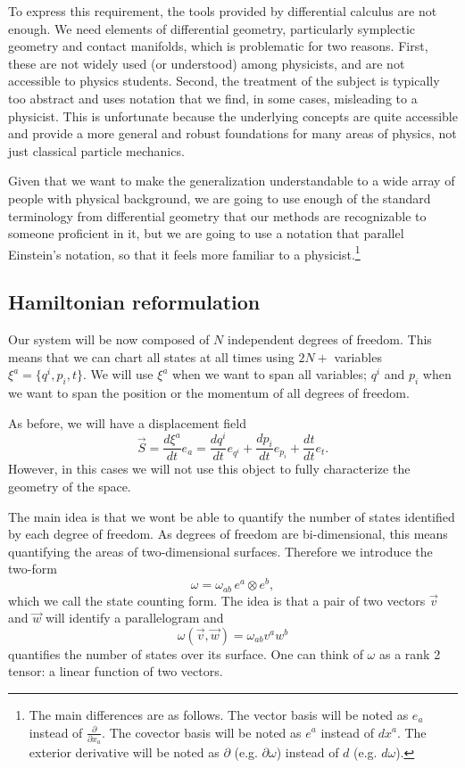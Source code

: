 \documentclass[10pt,twocolumn, nofootinbib]{revtex4-2}
\begin{document}
To express this requirement, the tools provided by differential calculus are not enough. We need elements of differential geometry, particularly symplectic geometry and contact manifolds, which is problematic for two reasons. First, these are not widely used (or understood) among physicists, and are not accessible to physics students. Second, the treatment of the subject is typically too abstract and uses notation that we find, in some cases, misleading to a physicist. This is unfortunate because the underlying concepts are quite accessible and provide a more general and robust foundations for many areas of physics, not just classical particle mechanics.

Given that we want to make the generalization understandable to a wide array of people with physical background, we are going to use enough of the standard terminology from differential geometry that our methods are recognizable to someone proficient in it, but we are going to use a notation that parallel Einstein's notation, so that it feels more familiar to a physicist.\footnote{The main differences are as follows. The vector basis will be noted as $e_a$ instead of $\frac{\partial}{\partial x_a}$. The covector basis will be noted as $e^a$ instead of $dx^a$. The exterior derivative will be noted as $\partial$ (e.g. $\partial \omega$) instead of $d$ (e.g. $d \omega$).}

\subsection{Hamiltonian reformulation}

Our system will be now composed of $N$ independent degrees of freedom. This means that we can chart all states at all times using $2N + $ variables $\xi^a = \{ q^i, p_i, t\}$. We will use $\xi^a$ when we want to span all variables; $q^i$ and $p_i$ when we want to span the position or the momentum of all degrees of freedom.

As before, we will have a displacement field
\begin{equation}
	\vec{S} = \frac{d\xi^a}{dt} e_{a} = \frac{dq^i}{dt} e_{q^i} + \frac{dp_i}{dt} e_{p_i} + \frac{dt}{dt} e_t.
\end{equation}
However, in this cases we will not use this object to fully characterize the geometry of the space.

The main idea is that we wont be able to quantify the number of states identified by each degree of freedom. As degrees of freedom are bi-dimensional, this means quantifying the areas of two-dimensional surfaces. Therefore we introduce the two-form
\begin{equation}
	\omega = \omega_{ab} \, e^a \otimes e^b,
\end{equation}
which we call the state counting form. The idea is that a pair of two vectors $\vec{v}$ and $\vec{w}$ will identify a parallelogram and 
\begin{equation}
	\omega(\vec{v}, \vec{w}) = \omega_{ab} v^a w^b
\end{equation}
quantifies the number of states over its surface. One can think of $\omega$ as a rank 2 tensor: a linear function of two vectors.
\end{document}
